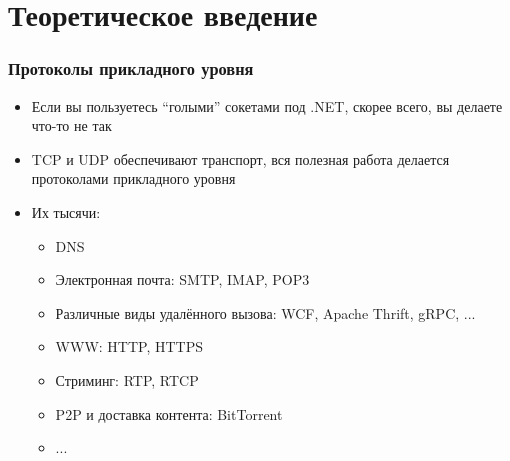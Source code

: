 \documentclass{../../slides-style}
\begin{document}
    \begin{frame}[plain]
        \titlepage
    \end{frame}

    \section{Теоретическое введение}

    \begin{frame}
        \frametitle{Протоколы прикладного уровня}
        \begin{itemize}
            \item Если вы пользуетесь ``голыми'' сокетами под .NET, скорее всего, вы делаете что-то не так
            \item TCP и UDP обеспечивают транспорт, вся полезная работа делается протоколами прикладного уровня
            \item Их тысячи:
            \begin{itemize}
                \item DNS
                \item Электронная почта: SMTP, IMAP, POP3
                \item Различные виды удалённого вызова: WCF, Apache Thrift, gRPC, ...
                \item WWW: HTTP, HTTPS
                \item Стриминг: RTP, RTCP
                \item P2P и доставка контента: BitTorrent
                \item ...
            \end{itemize}
        \end{itemize}
    \end{frame}
\end{document}
